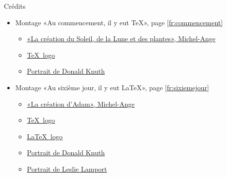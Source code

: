\begin{frame}{Crédits}
	\begin{itemize}
		\item Montage «Au commencement, il y eut \TeX », page \ref{fr:commencement}
		\begin{itemize}
			\scriptsize
			\item \href{https://en.wikipedia.org/wiki/The_Creation_of_the_Sun,_Moon_and_Vegetation}{«La création du Soleil, de la Lune et des plantes», Michel-Ange}
			\item \href{https://fr.m.wikipedia.org/wiki/TeX}{\TeX\ logo}
			\item \href{https://www-cs-faculty.stanford.edu/~knuth/}{Portrait de Donald Knuth}
		\end{itemize}
		\item Montage «Au sixième jour, il y eut \LaTeX », page \ref{fr:sixiemejour}
		\begin{itemize}
			\scriptsize
			\item \href{https://en.wikipedia.org/wiki/The_Creation_of_Adam}{«La création d'Adam», Michel-Ange}
			\item \href{https://fr.m.wikipedia.org/wiki/TeX}{\TeX\ logo}
			\item \href{https://fr.m.wikipedia.org/wiki/LaTeX}{\LaTeX\ logo}
			\item \href{https://www-cs-faculty.stanford.edu/~knuth/}{Portrait de Donald Knuth}
			\item \href{https://en.wikipedia.org/wiki/Leslie_Lamport}{Portrait de Leslie Lamport}
		\end{itemize}
	\end{itemize}
\end{frame}